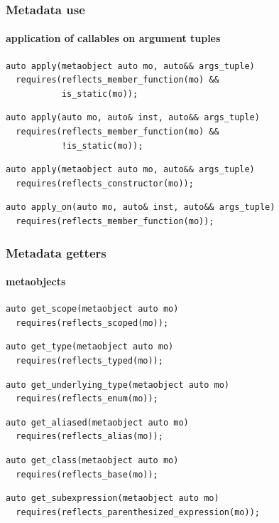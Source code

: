 \documentclass[compress,table,xcolor=table]{beamer}
\begin{document}
\begin{frame}[fragile]
  \frametitle{Metadata use}
  \framesubtitle{application of callables on argument tuples}
  \begin{lstlisting}[language=c++2x,basicstyle=\footnotesize\ttfamily]
auto apply(metaobject auto mo, auto&& args_tuple)
  requires(reflects_member_function(mo) &&
           is_static(mo));
  \end{lstlisting}
  \vfill
  \begin{lstlisting}[language=c++2x,basicstyle=\footnotesize\ttfamily]
auto apply(auto mo, auto& inst, auto&& args_tuple)
  requires(reflects_member_function(mo) &&
           !is_static(mo));
  \end{lstlisting}
  \vfill
  \begin{lstlisting}[language=c++2x,basicstyle=\footnotesize\ttfamily]
auto apply(metaobject auto mo, auto&& args_tuple)
  requires(reflects_constructor(mo));
  \end{lstlisting}
  \vfill
  \begin{lstlisting}[language=c++2x,basicstyle=\footnotesize\ttfamily]
auto apply_on(auto mo, auto& inst, auto&& args_tuple)
  requires(reflects_member_function(mo));
  \end{lstlisting}
\end{frame}
\begin{frame}[fragile]
  \frametitle{Metadata getters}
  \framesubtitle{metaobjects}
 \begin{lstlisting}[language=c++2x,basicstyle=\small\ttfamily]
auto get_scope(metaobject auto mo)
  requires(reflects_scoped(mo));
  \end{lstlisting}
  \vfill
  \begin{lstlisting}[language=c++2x,basicstyle=\small\ttfamily]
auto get_type(metaobject auto mo)
  requires(reflects_typed(mo));
  \end{lstlisting}
  \vfill
  \begin{lstlisting}[language=c++2x,basicstyle=\small\ttfamily]
auto get_underlying_type(metaobject auto mo)
  requires(reflects_enum(mo));
  \end{lstlisting}
  \vfill
  \begin{lstlisting}[language=c++2x,basicstyle=\small\ttfamily]
auto get_aliased(metaobject auto mo)
  requires(reflects_alias(mo));
  \end{lstlisting}
  \vfill
  \begin{lstlisting}[language=c++2x,basicstyle=\small\ttfamily]
auto get_class(metaobject auto mo)
  requires(reflects_base(mo));
  \end{lstlisting}
  \vfill
  \begin{lstlisting}[language=c++2x,basicstyle=\footnotesize\ttfamily]
auto get_subexpression(metaobject auto mo)
  requires(reflects_parenthesized_expression(mo));
  \end{lstlisting}
\end{frame}
\end{document}
